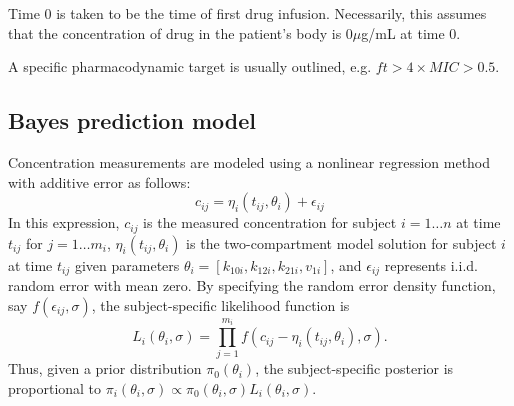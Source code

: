 \documentclass{article}\usepackage[]{graphicx}\usepackage[]{color}
\newcommand{\mic}{$ft > 4 \times MIC$}
\begin{document}
Time 0 is taken to be the time of first drug infusion. Necessarily, this assumes that the concentration of drug in the patient's body is 0$\mu$g/mL at time 0.

A specific pharmacodynamic target is usually outlined, e.g. \mic $> 0.5$.






\subsection{Bayes prediction model} %
Concentration measurements are modeled using a nonlinear regression method with additive error as follows:
\begin{displaymath}
c_{ij} = \eta_i(t_{ij}, \theta_i) + \epsilon_{ij}
\end{displaymath}
\noindent In this expression, $c_{ij}$ is the measured concentration for subject $i = 1 \ldots n$ at time $t_{ij}$ for $j = 1 \ldots m_i$, $\eta_i(t_{ij}, \theta_i)$ is the two-compartment model solution for subject $i$ at time $t_{ij}$ given parameters $\theta_i = [k_{10i}, k_{12i}, k_{21i}, v_{1i}]$, and $\epsilon_{ij}$ represents i.i.d. random error with mean zero. By specifying the random error density function, say $f(\epsilon_{ij}, \sigma)$, the subject-specific likelihood function is
\begin{displaymath}
L_i(\theta_i, \sigma) = \prod_{j=1}^{m_i} f(c_{ij} - \eta_i(t_{ij}, \theta_i), \sigma).
\end{displaymath}
\noindent Thus, given a prior distribution $\pi_0(\theta_i)$, the subject-specific posterior is proportional to $\pi_i(\theta_i, \sigma) \propto \pi_0(\theta_i,\sigma)L_i(\theta_i,\sigma)$.
\end{document}
